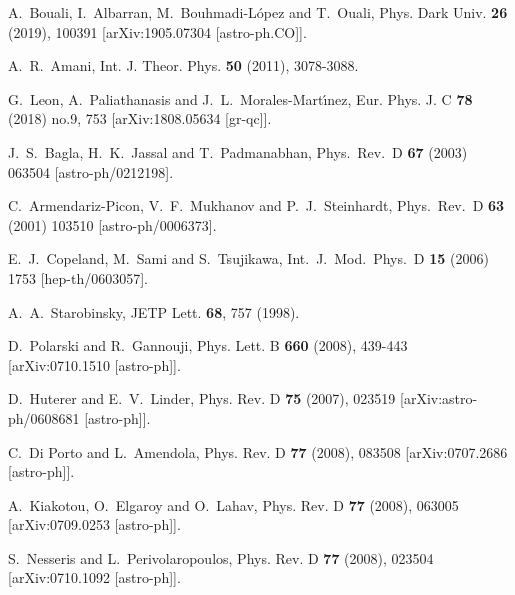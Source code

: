 \documentclass[aps,prd,amsmath,amssymb]{revtex4}
\begin{document}
\begin{thebibliography}{99}
 A.~Bouali, I.~Albarran, M.~Bouhmadi-L\'opez and T.~Ouali,
Phys. Dark Univ. \textbf{26} (2019), 100391
[arXiv:1905.07304 [astro-ph.CO]].  

 A.~R.~Amani,
Int. J. Theor. Phys. \textbf{50} (2011), 3078-3088.

 G.~Leon, A.~Paliathanasis and J.~L.~Morales-Mart\'\i{}nez,
Eur. Phys. J. C \textbf{78} (2018) no.9, 753
[arXiv:1808.05634 [gr-qc]].

 J.~S.~Bagla, H.~K.~Jassal and T.~Padmanabhan,
  Phys.\ Rev.\ D {\bf 67} (2003) 063504
  [astro-ph/0212198].

 C.~Armendariz-Picon, V.~F.~Mukhanov and P.~J.~Steinhardt,
  Phys.\ Rev.\ D {\bf 63} (2001) 103510
  [astro-ph/0006373].  
  
 E.~J.~Copeland, M.~Sami and S.~Tsujikawa,
  Int.\ J.\ Mod.\ Phys.\ D {\bf 15} (2006) 1753
[hep-th/0603057].  

 A.~A.~Starobinsky, JETP Lett. {\bf 68}, 757 (1998).

 D.~Polarski and R.~Gannouji,
Phys. Lett. B \textbf{660} (2008), 439-443
[arXiv:0710.1510 [astro-ph]].

 D.~Huterer and E.~V.~Linder,
Phys. Rev. D \textbf{75} (2007), 023519
[arXiv:astro-ph/0608681 [astro-ph]].

 C.~Di Porto and L.~Amendola,
Phys. Rev. D \textbf{77} (2008), 083508
[arXiv:0707.2686 [astro-ph]].

 A.~Kiakotou, O.~Elgaroy and O.~Lahav,
Phys. Rev. D \textbf{77} (2008), 063005
[arXiv:0709.0253 [astro-ph]].

 S.~Nesseris and L.~Perivolaropoulos,
Phys. Rev. D \textbf{77} (2008), 023504
[arXiv:0710.1092 [astro-ph]].


\end{thebibliography}
\end{document}
